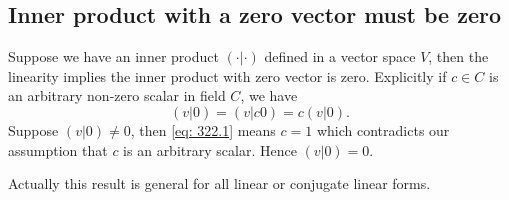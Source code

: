 \documentclass[10pt]{article}
\begin{document}
\subsection{Inner product with a zero vector must be zero}
Suppose we have an inner product $(\cdot|\cdot)$ defined in a vector space $V$, then the linearity implies the inner product with zero vector is zero. Explicitly if $c \in C$ is an arbitrary non-zero scalar in field $C$, we have
\begin{equation}
	(v|0) = (v|c 0) = c(v|0). \label{eq: 322.1}
\end{equation}
Suppose $(v|0) \neq 0$, then \eqref{eq: 322.1} means $c=1$ which contradicts our assumption that $c$ is an arbitrary scalar. Hence $(v|0) = 0$.

Actually this result is general for all linear or conjugate linear forms. 
\end{document}
